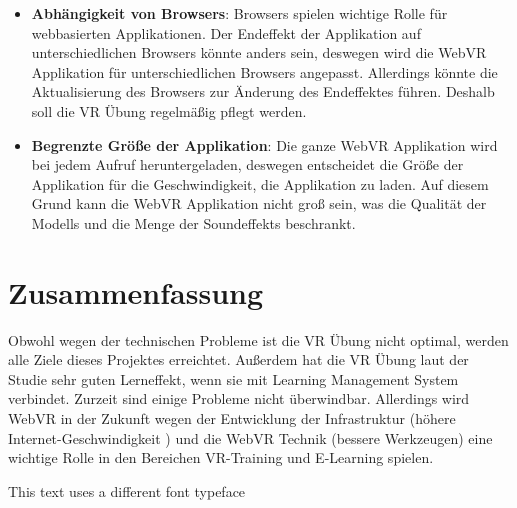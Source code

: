 \begin{itemize}
    \item \textbf{Abhängigkeit von Browsers}: Browsers spielen wichtige Rolle für webbasierten Applikationen. Der Endeffekt der Applikation auf unterschiedlichen Browsers könnte anders sein, deswegen wird die WebVR Applikation für unterschiedlichen Browsers angepasst. Allerdings könnte die Aktualisierung des Browsers zur Änderung des Endeffektes führen. Deshalb soll die VR Übung regelmäßig pflegt werden.
    
    \item \textbf{Begrenzte Größe der Applikation}: Die ganze WebVR Applikation wird bei jedem Aufruf heruntergeladen, deswegen entscheidet die Größe der Applikation für die Geschwindigkeit, die Applikation zu laden. Auf diesem Grund kann die WebVR Applikation nicht groß sein, was die Qualität der Modells und die Menge der Soundeffekts beschrankt.
\end{itemize}

\section{Zusammenfassung}

Obwohl wegen der technischen Probleme ist die VR Übung nicht optimal, werden alle Ziele dieses Projektes erreichtet. Außerdem hat die VR Übung laut der Studie sehr guten Lerneffekt, wenn sie mit Learning Management System verbindet. Zurzeit sind einige Probleme nicht überwindbar. Allerdings wird WebVR in der Zukunft wegen der Entwicklung der Infrastruktur (höhere Internet-Geschwindigkeit ) und die WebVR Technik (bessere Werkzeugen) eine wichtige Rolle in den Bereichen VR-Training und E-Learning spielen.

{\selectfont This text uses a different font typeface}